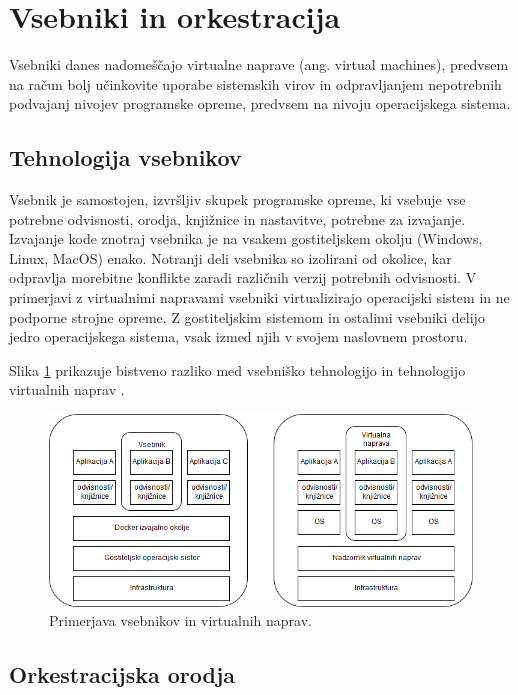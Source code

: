 \documentclass[a4paper, 12pt]{book}
\begin{document}
\section{Vsebniki in orkestracija}

Vsebniki danes nadomeščajo virtualne naprave (ang. virtual machines), predvsem na račun bolj učinkovite uporabe sistemskih virov in odpravljanjem ne\-po\-tre\-bnih podvajanj nivojev programske opreme, predvsem na nivoju operacijskega sistema.

\subsection{Tehnologija vsebnikov}
Vsebnik je samostojen, izvršljiv skupek programske opreme, ki vsebuje vse potrebne odvisnosti, orodja, knjižnice in nastavitve, potrebne za izvajanje.
Izvajanje kode znotraj vsebnika je na vsakem gostiteljskem okolju (Windows, Linux, MacOS) enako.
Notranji deli vsebnika so izolirani od okolice, kar odpravlja morebitne konflikte zaradi različnih verzij potrebnih odvisnosti.
V primerjavi z virtualnimi napravami vsebniki virtualizirajo operacijski sistem in ne podporne strojne opreme.
Z gostiteljskim sistemom in ostalimi vsebniki delijo jedro operacijskega sistema, vsak izmed njih v svojem naslovnem prostoru.

Slika \ref{vm_vs_container} prikazuje bistveno razliko med vsebniško tehnologijo in tehnologijo virtualnih naprav \cite{dockerContainer}.

\begin{figure}[h]
	\includegraphics[width=1.0\textwidth]{slike/vsebniki_vm.png}
	\caption{Primerjava vsebnikov in virtualnih naprav.}
	\label{vm_vs_container}
\end{figure}


\subsection{Orkestracijska orodja}
\end{document}
